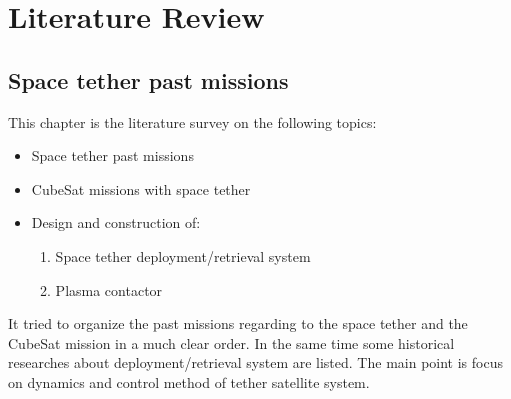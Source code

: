 \chapter{Literature Review}\label{sec-literature}
\section{Space tether past missions}
This chapter is the literature survey on the following topics:
\begin{itemize}
\item Space tether past missions
\item CubeSat missions with space tether
\item Design and construction of:
\begin{enumerate}
\item Space tether deployment/retrieval system
\item Plasma contactor
\end{enumerate}
\end{itemize}

It tried to organize the past missions regarding to the space tether and the CubeSat mission in a much clear order. In the same time some historical researches about deployment/retrieval system are listed. The main point is focus on dynamics and control method of tether satellite system.
